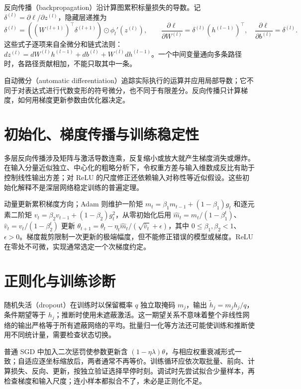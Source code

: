 反向传播（backpropagation）沿计算图累积标量损失的导数。记 $\delta^{(l)}=\partial\ell/\partial z^{(l)}$，隐藏层递推为
\begin{equation}
 \delta^{(l)}=((W^{(l+1)})^\top\delta^{(l+1)})\odot\phi_l'(z^{(l)}),\qquad
 \frac{\partial\ell}{\partial W^{(l)}}=\delta^{(l)}(h^{(l-1)})^\top,\quad
 \frac{\partial\ell}{\partial b^{(l)}}=\delta^{(l)}.
 \label{eq:ml-backprop}
\end{equation}
这些式子逐项来自全微分和链式法则：$dz^{(l)}=dW^{(l)}h^{(l-1)}+db^{(l)}+W^{(l)}dh^{(l-1)}$。一个中间变量通向多条路径时，各路径贡献相加，不能只取其中一条。

自动微分（automatic differentiation）追踪实际执行的运算并应用局部导数；它不同于对表达式进行代数变形的符号微分，也不同于有限差分。反向传播只计算梯度，如何用梯度更新参数由优化器决定。

\section{初始化、梯度传播与训练稳定性}

多层反向传播涉及矩阵与激活导数连乘，反复缩小或放大就产生梯度消失或爆炸。在输入分量近似独立、中心化的粗略分析下，令权重方差与输入维数成反比有助于控制线性输出方差；对 ReLU 的尺度修正还依赖输入对称性等近似假设。这些初始化解释不是深层网络稳定训练的普遍定理。

动量更新累积梯度方向；Adam 则维护一阶矩 $m_t=\beta_1m_{t-1}+(1-\beta_1)g_t$ 和逐元素二阶矩 $v_t=\beta_2v_{t-1}+(1-\beta_2)g_t^2$，从零初始化后用
$\widehat m_t=m_t/(1-\beta_1^t)$、$\widehat v_t=v_t/(1-\beta_2^t)$
更新 $\theta_{t+1}=\theta_t-\eta_t\widehat m_t/(\sqrt{\widehat v_t}+\epsilon)$，其中 $0\leq\beta_1,\beta_2<1$、$\epsilon>0$。梯度裁剪限制一次更新的极端幅度，但不能修正错误的模型或梯度。ReLU 在零处不可微，实现通常选定一个次梯度约定。

\section{正则化与训练诊断}

随机失活（dropout）在训练时以保留概率 $q$ 独立取掩码 $m_j$，输出 $\widetilde h_j=m_jh_j/q$，条件期望等于 $h_j$；推断时使用未遮蔽激活。这一期望关系不意味着整个非线性网络的输出严格等于所有遮蔽网络的平均。批量归一化等方法还可能使训练和推断使用不同统计量，需要检查状态切换。

普通 SGD 中加入二次惩罚使参数更新含 $(1-\eta\lambda)\theta$，与相应权重衰减形式一致；自适应逐坐标缩放后，两者通常不再等价。训练循环应依次取批量、前向、计算损失、反向、更新，按独立验证选择早停时刻。调试时先尝试拟合少量样本，再检查梯度和输入尺度；连小样本都拟合不了，未必是正则化不足。

